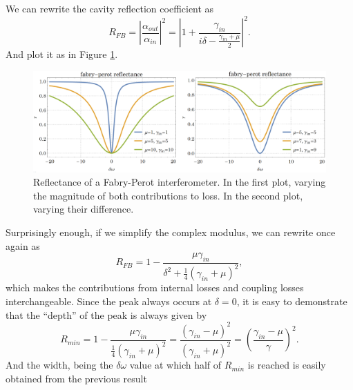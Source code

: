 We can rewrite the cavity reflection coefficient as
\begin{equation}
    R_{FB}=\left|\frac{\alpha_{out}}{\alpha_{in}}\right|^2=\left|1+\frac{\gamma_{in}}{i\delta-\frac{\gamma_{in}+\mu}{2}}\right|^2.
\end{equation}
And plot it as in Figure \ref{fig:reflectance.plot}.

\begin{figure}[H]
    \centering
    \includegraphics[width=1\linewidth]{Figuras/fabry-perot reflectance plot.png}
    \caption{Reflectance of a Fabry-Perot interferometer. In the first plot, varying the magnitude of both contributions to loss. In the second plot, varying their difference.}
    \label{fig:reflectance.plot}
\end{figure}

Surprisingly enough, if we simplify the complex modulus, we can rewrite once again as
\begin{equation}
    R_{FB}=1-\frac{\mu\gamma_{in}}{\delta^2+\frac{1}{4}(\gamma_{in}+\mu)^2},
\end{equation}
which makes the contributions from internal losses and coupling losses interchangeable. Since the peak always occurs at $\delta=0$, it is easy to demonstrate that the ``depth'' of the peak is always given by
\begin{equation}
    R_{min}=1-\frac{\mu\gamma_{in}}{\frac{1}{4}(\gamma_{in}+\mu)^2}=\frac{(\gamma_{in}-\mu)^2}{(\gamma_{in}+\mu)^2}=\left(\frac{\gamma_{in}-\mu}{\gamma}\right)^2.
\end{equation}
And the width, being the $\delta\omega$ value at which half of $R_{min}$ is reached is easily obtained from the previous result




